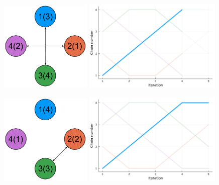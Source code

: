 \begin{figure}[t]
\begin{minipage}{0.48\textwidth}
  \end{minipage}
  \begin{minipage}{0.48\textwidth}
    \centering
    \includegraphics[width=0.39\textwidth]{../img/Communication_3_v3.pdf}
    \includegraphics[width=0.59\textwidth]{../img/index_process_3.pdf}
  \end{minipage}
  \begin{minipage}{0.48\textwidth}
    \centering
    \includegraphics[width=0.39\textwidth]{../img/Communication_4_v3.pdf}
    \includegraphics[width=0.59\textwidth]{../img/index_process_4.pdf}

\end{minipage}
\end{figure}
